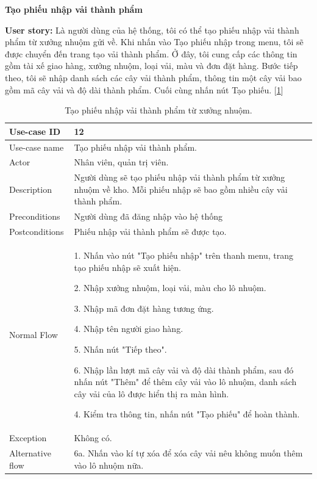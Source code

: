 \newpage
\textbf{Tạo phiếu nhập vải thành phẩm}\par
\textbf{User story:} Là người dùng của hệ thống, tôi có thể tạo phiếu nhập vải thành phẩm từ xưởng nhuộm gửi về. Khi nhấn vào Tạo phiếu nhập trong menu, tôi sẽ được chuyển đến trang tạo vải thành phẩm. Ở đây, tôi cung cấp các thông tin gồm tài xế giao hàng, xưởng nhuộm, loại vải, màu và đơn đặt hàng. Bước tiếp theo, tôi sẽ nhập danh sách các cây vải thành phẩm, thông tin một cây vải bao gồm mã cây vải và độ dài thành phẩm. Cuối cùng nhấn nút Tạo phiếu. [\ref{bang11}]
\begin{table}[!htp]
    \centering
    \begin{tabular}{|m{3cm}|m{10cm}|}
    \hline 
        Use-case ID & 12\\ \hline
        Use-case name & Tạo phiếu nhập vải thành phẩm.\\ \hline
        Actor & Nhân viên, quản trị viên.\\ \hline
        Description & Người dùng sẽ tạo phiếu nhập vải thành phẩm từ xưởng nhuộm về kho. Mỗi phiếu nhập sẽ bao gồm nhiều cây vải thành phẩm.\\ \hline
        Preconditions & Người dùng đã đăng nhập vào hệ thống \\ \hline
        Postconditions & Phiếu nhập vải thành phẩm sẽ được tạo.\\ \hline
        Normal Flow & 
        1. Nhấn vào nút "Tạo phiếu nhập" trên thanh menu, trang tạo phiếu nhập sẽ xuất hiện.\par
        2. Nhập xưởng nhuộm, loại vải, màu cho lô nhuộm.\par
        3. Nhập mã đơn đặt hàng tương ứng.\par
        4. Nhập tên người giao hàng.\par
        5. Nhấn nút "Tiếp theo".\par
        6. Nhập lần lượt mã cây vải và độ dài thành phẩm, sau đó nhấn nút "Thêm" để thêm cây vải vào lô nhuộm, danh sách cây vải của lô được hiển thị ra màn hình.\par
        4. Kiểm tra thông tin, nhấn nút "Tạo phiếu" để hoàn thành.
        \\ \hline
        Exception & Không có.
        \\ \hline
        Alternative flow & 
        6a. Nhấn vào kí tự xóa để xóa cây vải nêu không muốn thêm vào lô nhuộm nữa.
        \\ 
    \hline 
    \end{tabular}
    \caption{Tạo phiếu nhập vải thành phẩm từ xưởng nhuộm.}
    \label{bang11}
\end{table}

